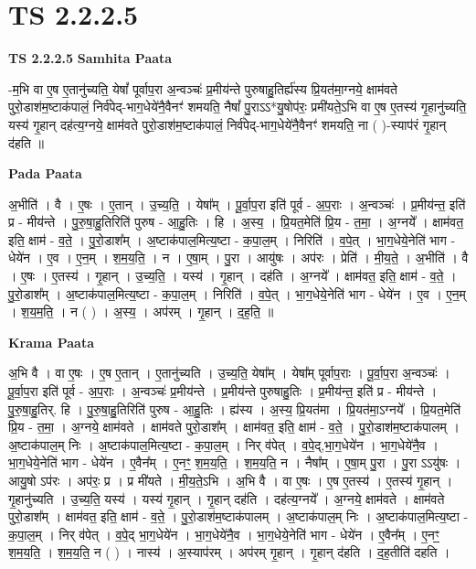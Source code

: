 \documentclass[17pt]{extarticle}
\begin{document}
\section{ TS 2.2.2.5 }

\textbf{TS 2.2.2.5 } \newline
\textbf{Samhita Paata} \newline

-म॒भि वा ए॒ष ए॒तानु॑च्यति॒ येषां᳚ पूर्वाप॒रा अ॒न्वञ्चः॑ प्र॒मीय॑न्ते पुरुषाहु॒तिर्ह्य॑स्य प्रि॒यत॑मा॒ग्नये॒ क्षाम॑वते पुरो॒डाश॑म॒ष्टाक॑पालं॒ निर्व॑पेद्-भाग॒धेये॑नै॒वैनꣳ॑ शमयति॒ नैषां᳚ पु॒राऽऽ*यु॒षोप॑रः॒ प्रमी॑यते॒ऽभि वा ए॒ष ए॒तस्य॑ गृ॒हानु॑च्यति॒ यस्य॑ गृ॒हान् दह॑त्य॒ग्नये॒ क्षाम॑वते पुरो॒डाश॑म॒ष्टाक॑पालं॒ निर्व॑पेद्-भाग॒धेये॑नै॒वैनꣳ॑ शमयति॒ ना ( )-स्याप॑रं गृ॒हान् द॑हति ॥ \newline

\textbf{Pada Paata} \newline

अ॒भीति॑ । वै । ए॒षः । ए॒तान् । उ॒च्य॒ति॒ । येषा᳚म् । पू॒र्वा॒प॒रा इति॑ पूर्व - अ॒प॒राः । अ॒न्वञ्चः॑ । प्र॒मीय॑न्त॒ इति॑ प्र - मीय॑न्ते । पु॒रु॒षा॒हु॒तिरिति॑ पुरुष - आ॒हु॒तिः । हि । अ॒स्य॒ । प्रि॒यत॒मेति॑ प्रि॒य - त॒मा॒ । अ॒ग्नये᳚ । क्षाम॑वत॒ इति॒ क्षाम॑ - व॒ते॒ । पु॒रो॒डाश᳚म् । अ॒ष्टाक॑पाल॒मित्य॒ष्टा - क॒पा॒ल॒म् । निरिति॑ । व॒पे॒त् । भा॒ग॒धेये॒नेति॑ भाग - धेये॑न । ए॒व । ए॒न॒म् । श॒म॒य॒ति॒ । न । ए॒षा॒म् । पु॒रा । आयु॑षः । अप॑रः । प्रेति॑ । मी॒य॒ते॒ । अ॒भीति॑ । वै । ए॒षः । ए॒तस्य॑ । गृ॒हान् । उ॒च्य॒ति॒ । यस्य॑ । गृ॒हान् । दह॑ति । अ॒ग्नये᳚ । क्षाम॑वत॒ इति॒ क्षाम॑ - व॒ते॒ । पु॒रो॒डाश᳚म् । अ॒ष्टाक॑पाल॒मित्य॒ष्टा - क॒पा॒ल॒म् । निरिति॑ । व॒पे॒त् । भा॒ग॒धेये॒नेति॑ भाग - धेये॑न । ए॒व । ए॒न॒म् । श॒य॒म॒ति॒ । न ( ) । अ॒स्य॒ । अप॑रम् । गृ॒हान् । द॒ह॒ति॒ ॥  \newline


\textbf{Krama Paata} \newline

अ॒भि वै । वा ए॒षः । ए॒ष ए॒तान् । ए॒तानु॑च्यति । उ॒च्य॒ति॒ येषा᳚म् । येषा᳚म् पूर्वाप॒राः । पू॒र्वा॒प॒रा अ॒न्वञ्चः॑ । पू॒र्वा॒प॒रा इति॑ पूर्व - अ॒प॒राः । अ॒न्वञ्चः॑ प्र॒मीय॑न्ते । प्र॒मीय॑न्ते पुरुषाहु॒तिः । प्र॒मीय॑न्त॒ इति॑ प्र - मीय॑न्ते । पु॒रु॒षा॒हु॒तिर्. हि । पु॒रु॒षा॒हु॒तिरिति॑ पुरुष - आ॒हु॒तिः । ह्य॑स्य । अ॒स्य॒ प्रि॒यत॑मा । प्रि॒यत॑मा॒ऽग्नये᳚ । प्रि॒यत॒मेति॑ प्रि॒य - त॒मा॒ । अ॒ग्नये॒ क्षाम॑वते । क्षाम॑वते पुरो॒डाश᳚म् । क्षाम॑वत॒ इति॒ क्षाम॑ - व॒ते॒ । पु॒रो॒डाश॑म॒ष्टाक॑पालम् । अ॒ष्टाक॑पाल॒म् निः । अ॒ष्टाक॑पाल॒मित्य॒ष्टा - क॒पा॒ल॒म् । निर् व॑पेत् । व॒पे॒द्,भा॒ग॒धेये॑न । भा॒ग॒धेये॑नै॒व । भा॒ग॒धेये॒नेति॑ भाग - धेये॑न । ए॒वैन᳚म् । ए॒नꣳ॒॒ श॒म॒य॒ति॒ । श॒म॒य॒ति॒ न । नैषा᳚म् । ए॒षा॒म् पु॒रा । पु॒रा ऽऽयु॑षः । आयु॒षो ऽप॑रः । अप॑रः॒ प्र । प्र मी॑यते । मी॒य॒ते॒ऽभि । अ॒भि वै । वा ए॒षः । ए॒ष ए॒तस्य॑ । ए॒तस्य॑ गृ॒हान् । गृ॒हानु॑च्यति । उ॒च्य॒ति॒ यस्य॑ । यस्य॑ गृ॒हान् । गृ॒हान् दह॑ति । दह॑त्य॒ग्नये᳚ । अ॒ग्नये॒ क्षाम॑वते । क्षाम॑वते पुरो॒डाश᳚म् । क्षाम॑वत॒ इति॒ क्षाम॑ - व॒ते॒ । पु॒रो॒डाश॑म॒ष्टाक॑पालम् । अ॒ष्टाक॑पाल॒म् निः । अ॒ष्टाक॑पाल॒मित्य॒ष्टा - क॒पा॒ल॒म् । निर् व॑पेत् । व॒पे॒द् भा॒ग॒धेये॑न । भा॒ग॒धेये॑नै॒व । भा॒ग॒धेये॒नेति॑ भाग - धेये॑न । ए॒वैन᳚म् । ए॒नꣳ॒॒ श॒म॒य॒ति॒ । श॒म॒य॒ति॒ न ( ) । नास्य॑ । अ॒स्याप॑रम् । अप॑रम् गृ॒हान् । गृ॒हान् द॑हति । द॒ह॒तीति॑ दहति । \newline
\end{document}
